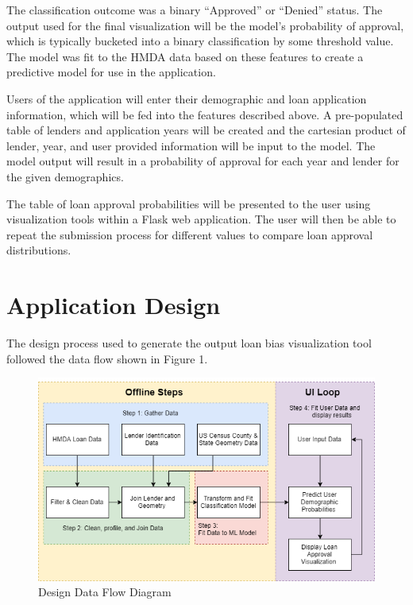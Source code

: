\documentclass[conference,compsoc]{IEEEtran}
\begin{document}
The classification outcome was a binary “Approved” or “Denied” status. The output used for the final visualization will be the model’s probability of approval, which is typically bucketed into a binary classification by some threshold value. The model was fit to the HMDA data based on these features to create a predictive model for use in the application.

Users of the application will enter their demographic and loan application information, which will be fed into the features described above. A pre-populated table of lenders and application years will be created and the cartesian product of lender, year, and user provided information will be input to the model. The model output will result in a probability of approval for each year and lender for the given demographics.

The table of loan approval probabilities will be presented to the user using visualization tools within a Flask web application. The user will then be able to repeat the submission process for different values to compare loan approval distributions.   

\section{Application Design}

The design process used to generate the output loan bias visualization tool followed the data flow shown in Figure 1.


\begin{figure}[h!]
  \includegraphics[width=\linewidth]{SparkDesignDiagram.png}
  \caption{Design Data Flow Diagram}
  \label{fig:design}
\end{figure}
\end{document}
